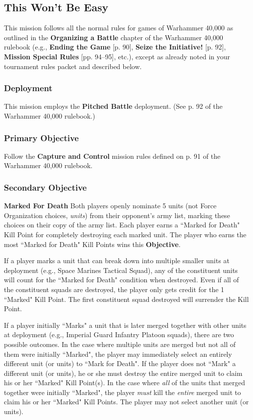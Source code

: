 \documentclass[12pt,titlepage]{article}
\newcommand{\paragraphsmall}[1]{\noindent\textbf{#1}\quad}
\newcommand{\gameboilerplate}{This mission follows all the normal rules for games of Warhammer 40,000 as outlined in the \textbf{Organizing a Battle} chapter of the Warhammer 40,000 rulebook (e.g., \textbf{Ending the Game} [p. 90], \textbf{Seize the Initiative!} [p. 92], \textbf{Mission Special Rules} [pp. 94--95], etc.), except as already noted in your tournament rules packet and described below.}
\newcommand{\pitchedbattle}{This mission employs the \textbf{Pitched Battle} deployment. (See p. 92 of the Warhammer 40,000 rulebook.)}
\newcommand{\captureandcontrol}{Follow the \textbf{Capture and Control} mission rules defined on p. 91 of the Warhammer 40,000 rulebook.}
\begin{document}
\subsection*{This Won't Be Easy}
{\footnotesize
\gameboilerplate

\vspace{-9pt}
\subsubsection*{Deployment}

\vspace{-3pt}
\pitchedbattle

\vspace{-9pt}
\subsubsection*{Primary Objective}

\vspace{-3pt}
\captureandcontrol

\vspace{-9pt}
\subsubsection*{Secondary Objective}

\vspace{-3pt}
\paragraphsmall{Marked For Death} Both players openly nominate 5 units (not Force Organization choices, \textit{units}) from their opponent's army list, marking these choices on their copy of the army list.  Each player earns a ``Marked for Death" Kill Point for completely destroying each marked unit. The player who earns the most ``Marked for Death" Kill Points wins this \textbf{Objective}.

If a player marks a unit that can break down into multiple smaller units at deployment (e.g., Space Marines Tactical Squad), any of the constituent units will count for the ``Marked for Death" condition when destroyed. Even if all of the constituent squads are destroyed, the player only gets credit for the 1 ``Marked" Kill Point. The first constituent squad destroyed will surrender the Kill Point.

If a player initially ``Marks" a unit that is later merged together with other units at deployment (e.g., Imperial Guard Infantry Platoon squads), there are two possible outcomes. In the case where multiple units are merged but not all of them were initially ``Marked", the player may immediately select an entirely different unit (or units) to ``Mark for Death". If the player does not ``Mark" a different unit (or units), he or she must destroy the entire merged unit to claim his or her ``Marked" Kill Point(s). In the case where \textit{all} of the units that merged together were initially ``Marked", the player \textit{must} kill the \textit{entire} merged unit to claim his or her ``Marked" Kill Points. The player may not select another unit (or units).

}
\end{document}
